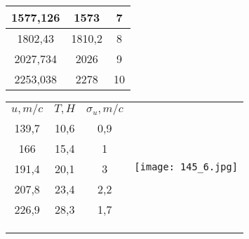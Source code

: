 \documentclass[a4paper, 12pt]{article}%
\begin{document}
\begin{enumerate}
\begin{center}
\begin{tabular}{|c|c|c|}
1577,126         & 1573          & 7         \\ \hline
1802,43          & 1810,2        & 8         \\ \hline
2027,734         & 2026          & 9         \\ \hline
2253,038         & 2278          & 10        \\ \hline
\end{tabular}
\end{center}
\begin{tabular}{cccl}
\cline{1-3}
\multicolumn{1}{|c|}{$u, m/c$} & \multicolumn{1}{c|}{$T, H$} & \multicolumn{1}{c|}{$\sigma_u, m/c$} & \multirow{20}{*}{\texttt{[image: 145\_6.jpg]}} \\ \cline{1-3}
\multicolumn{1}{|c|}{139,7}    & \multicolumn{1}{c|}{10,6}   & \multicolumn{1}{c|}{0,9}             &                                                                                                         \\ \cline{1-3}
\multicolumn{1}{|c|}{166}      & \multicolumn{1}{c|}{15,4}   & \multicolumn{1}{c|}{1}               &                                                                                                         \\ \cline{1-3}
\multicolumn{1}{|c|}{191,4}    & \multicolumn{1}{c|}{20,1}   & \multicolumn{1}{c|}{3}               &                                                                                                         \\ \cline{1-3}
\multicolumn{1}{|c|}{207,8}    & \multicolumn{1}{c|}{23,4}   & \multicolumn{1}{c|}{2,2}             &                                                                                                         \\ \cline{1-3}
\multicolumn{1}{|c|}{226,9}    & \multicolumn{1}{c|}{28,3}   & \multicolumn{1}{c|}{1,7}             &                                                                                                         \\ \cline{1-3}
                               &                             &                                      &                                                                                                         \\
                               &                             &                                      &                                                                                                         \\
                               &                             &                                      &                                                                                                         \\

\end{tabular}
\end{enumerate}
\end{document}

